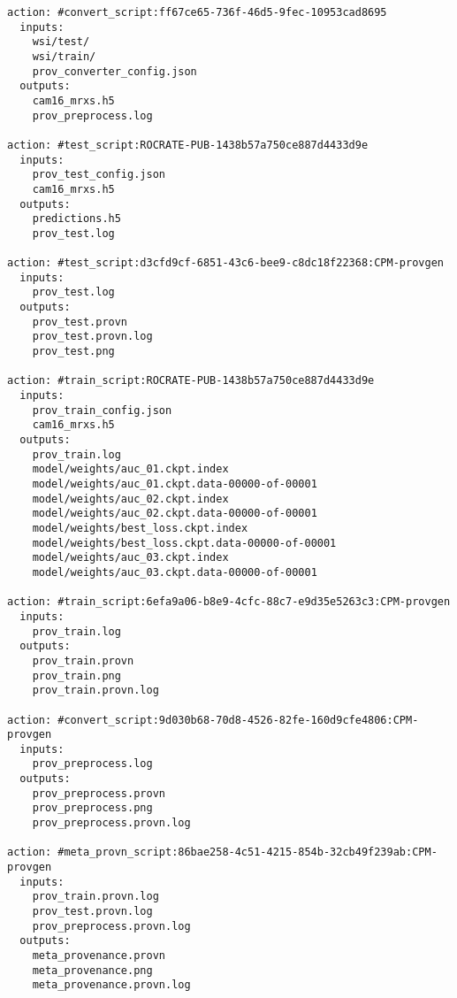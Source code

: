 \documentclass[10pt,letterpaper]{article}
\begin{document}
\begin{lstlisting}[float,basicstyle=\scriptsize\ttfamily,caption={Excerpt of the output of the \texttt{runcrate report} command for the AI model training Process Run Crate; only inputs and outputs of the actions are shown. The listing shows the connections between the pipeline actions through the entities they produce or consume -- e.g., \texttt{cam16\_mrxs.h5} is output of the conversion script \texttt{convert\_script:ff67\ldots} and input for the training script \texttt{train\_script:ROCRATE\ldots}},label={lst:model_training_pipeline_report}]
action: #convert_script:ff67ce65-736f-46d5-9fec-10953cad8695
  inputs:
    wsi/test/
    wsi/train/
    prov_converter_config.json
  outputs:
    cam16_mrxs.h5
    prov_preprocess.log

action: #test_script:ROCRATE-PUB-1438b57a750ce887d4433d9e
  inputs:
    prov_test_config.json
    cam16_mrxs.h5
  outputs:
    predictions.h5
    prov_test.log

action: #test_script:d3cfd9cf-6851-43c6-bee9-c8dc18f22368:CPM-provgen
  inputs:
    prov_test.log
  outputs:
    prov_test.provn
    prov_test.provn.log
    prov_test.png

action: #train_script:ROCRATE-PUB-1438b57a750ce887d4433d9e
  inputs:
    prov_train_config.json
    cam16_mrxs.h5
  outputs:
    prov_train.log
    model/weights/auc_01.ckpt.index
    model/weights/auc_01.ckpt.data-00000-of-00001
    model/weights/auc_02.ckpt.index
    model/weights/auc_02.ckpt.data-00000-of-00001
    model/weights/best_loss.ckpt.index
    model/weights/best_loss.ckpt.data-00000-of-00001
    model/weights/auc_03.ckpt.index
    model/weights/auc_03.ckpt.data-00000-of-00001

action: #train_script:6efa9a06-b8e9-4cfc-88c7-e9d35e5263c3:CPM-provgen
  inputs:
    prov_train.log
  outputs:
    prov_train.provn
    prov_train.png
    prov_train.provn.log

action: #convert_script:9d030b68-70d8-4526-82fe-160d9cfe4806:CPM-provgen
  inputs:
    prov_preprocess.log
  outputs:
    prov_preprocess.provn
    prov_preprocess.png
    prov_preprocess.provn.log

action: #meta_provn_script:86bae258-4c51-4215-854b-32cb49f239ab:CPM-provgen
  inputs:
    prov_train.provn.log
    prov_test.provn.log
    prov_preprocess.provn.log
  outputs:
    meta_provenance.provn
    meta_provenance.png
    meta_provenance.provn.log
\end{lstlisting}
\end{document}
